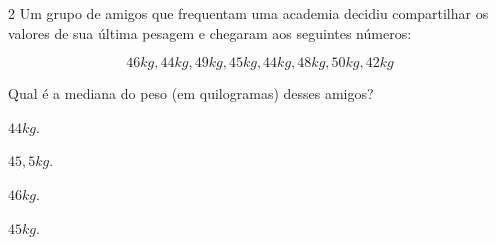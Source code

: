 









\num{2} Um grupo de amigos que frequentam uma academia decidiu compartilhar os
valores de sua última pesagem e chegaram aos seguintes números:

$$46 kg, 44 kg, 49 kg, 45 kg, 44 kg, 48 kg, 50 kg, 42 kg$$

Qual é a mediana do peso (em quilogramas) desses amigos?

\begin{escolha}[itemsep=0pt]
\item $44 kg$.
\item $45,5 kg$.
\item $46 kg$.
\item $45 kg$.
\end{escolha}






